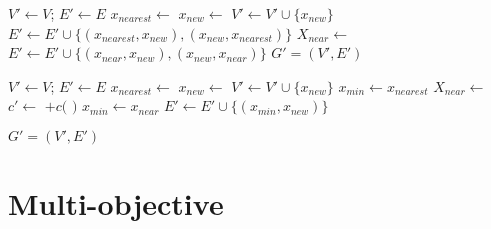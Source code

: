 \documentclass[paper=a4, fontsize=11pt]{scrartcl}
\begin{document}
\begin{algorithm}
\begin{algorithmic}[1]
\State $ V' \leftarrow V $; $ E' \leftarrow E $
\State $ x_{nearest} \leftarrow $ 
\State $ x_{new} \leftarrow $ 
\State $ V' \leftarrow V' \cup \{ x_{new} \} $
\State $ E' \leftarrow E' \cup \{ ( x_{nearest} , x_{new} ) , ( x_{new} , x_{nearest} ) \} $
\State $ X_{near} \leftarrow $ 
$ E' \leftarrow E' \cup \{ ( x_{near}, x_{new} ) , ( x_{new} , x_{near} ) \} $
\EndIf
\EndFor
\EndIf
\Return $ G' = (V', E') $ 
\end{algorithmic}
\label{alg:rrg_extend}
\caption{ $ \mbox{Extend}_{RRG} (G, x) $}
\end{algorithm}

\begin{algorithm}
\begin{algorithmic}[1]
\State $ V' \leftarrow V $; $ E' \leftarrow E $
\State $ x_{nearest} \leftarrow $ 
\State $ x_{new} \leftarrow $ 
\State $ V' \leftarrow V' \cup \{ x_{new} \} $
\State $ x_{min} \leftarrow x_{nearest} $
\State $ X_{near} \leftarrow $ 
\State $ c' \leftarrow $  $ + c( $  $ ) $ 
\State $ x_{min} \leftarrow x_{near} $
\EndIf
\EndIf
\EndFor
\State $ E' \leftarrow E' \cup \{ ( x_{min}, x_{new} ) \} $
\EndIf
{}

\EndFor
\Return $ G' = (V', E') $ 
\end{algorithmic}
\label{alg:rrtstar_extend}
\caption{ $ \mbox{Extend}_{RRT^{*}} (G, x) $}
\end{algorithm}

\section{Multi-objective}




\end{document}
